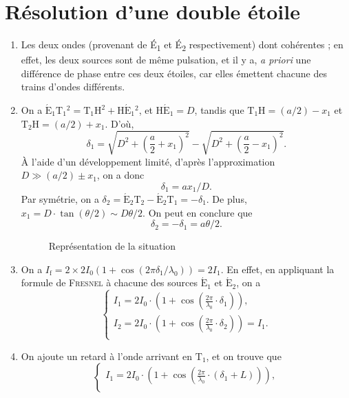 \section{Résolution d'une double étoile}

\begin{enumerate}
	\item Les deux ondes (provenant de É\textsubscript{1} et É\textsubscript{2} respectivement) dont cohérentes ; en effet, les deux sources sont de même pulsation, et il y a, \textit{a priori} une différence de phase entre ces deux étoiles, car elles émettent chacune des trains d'ondes différents.
	\item On a $\mathrm{\acute{E}_1 T_1}{}^2 = \mathrm{T_1H}^2 + \mathrm{H\acute{E}_1}{}^2$, et $\mathrm{H\acute{E}_1} = D$, tandis que $\mathrm{T_1H} = (a / 2) - x_1$ et $\mathrm{T_2H} = (a / 2) + x_1$.
		D'où, \[
			\delta_1 = \sqrt{D^2 + \left( \frac{a}{2} + x_1 \right)^2} - \sqrt{D^2 + \left( \frac{a}{2} - x_1 \right)^2}
		.\]
		À l'aide d'un développement limité, d'après l'approximation $D \gg (a / 2) \pm x_1$, on a donc \[
			\delta_1 = a x_1 / D
		.\]
		Par symétrie, on a $\delta_2 = \mathrm{\acute{E}_2T_2 - \mathrm{\acute{E}_2T_1}} = -\delta_1$.
		De plus, $x_1 = D \cdot \tan(\theta / 2) \sim D \theta / 2$.
		On peut en conclure que \[
			\boxed{\delta_2 = -\delta_1 = a \theta / 2.}
		\]
		\begin{figure}[H]
			\centering
			
			\caption{Représentation de la situation}
		\end{figure}
	\item On a $I_\mathrm{f}  = 2 \times 2 I_0 (1 + \cos(2\pi \delta_1 / \lambda_0)) = 2I_1$. En effet, en appliquant la formule de \textsc{Fresnel} à chacune des sources $\mathrm{\acute{E}_1}$ et $\mathrm{\acute{E}_2}$, on a \[
			\begin{cases}
				I_1 = 2 I_0 \cdot \left( 1 + \cos\left( \frac{2\pi}{\lambda_0} \cdot \delta_1 \right) \right),\\
				I_2 = 2 I_0 \cdot \left( 1 + \cos\left( \frac{2\pi}{\lambda_0} \cdot \delta_2 \right) \right) = I_1.\\
			\end{cases}
		\]
	\item On ajoute un retard à l'onde arrivant en $\mathrm{T_1}$, et on trouve que
		\[
			\begin{cases}
				I_1 = 2I_0 \cdot \left( 1 + \cos\left( \frac{2\pi}{\lambda_0} \cdot (\delta_1 + L) \right) \right),\\

\end{cases}\]
\end{enumerate}
